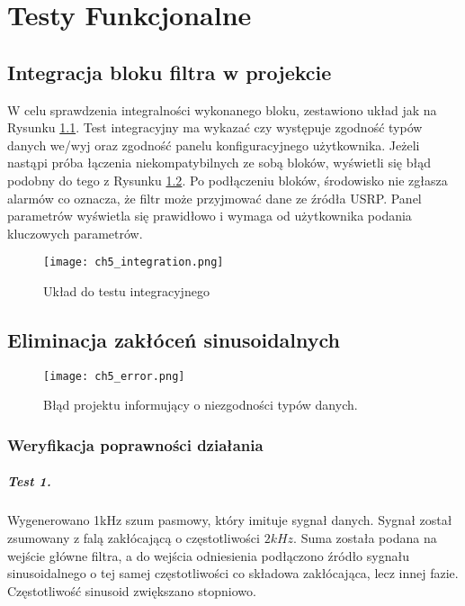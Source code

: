 \chapter{Testy Funkcjonalne}
\section{Integracja bloku filtra w projekcie}

W celu sprawdzenia integralności wykonanego bloku, zestawiono układ jak na Rysunku \ref{fig:itest}.
Test integracyjny ma wykazać czy występuje zgodność typów danych we/wyj oraz zgodność panelu konfiguracyjnego użytkownika.
Jeżeli nastąpi próba łączenia niekompatybilnych ze sobą bloków, wyświetli się błąd podobny do tego z Rysunku \ref{fig:error}.
Po podłączeniu bloków, środowisko nie zgłasza alarmów co oznacza, że filtr może przyjmować dane ze źródła USRP. 
Panel parametrów wyświetla się prawidłowo i wymaga od użytkownika podania kluczowych parametrów.
  
\begin{figure}[ht]
\centering
\texttt{[image: ch5\_integration.png]}
\caption{Układ do testu integracyjnego}
\label{fig:itest}
\end{figure}

\section{Eliminacja zakłóceń sinusoidalnych}

\begin{figure}[ht]
\centering
\texttt{[image: ch5\_error.png]}
\caption{Błąd projektu informujący o niezgodności typów danych.}
\label{fig:error}
\end{figure}
\subsection{Weryfikacja poprawności działania}

\paragraph{Test 1.}
Wygenerowano 1kHz szum pasmowy, który imituje sygnał danych.
Sygnał został zsumowany z falą zakłócającą o częstotliwości $2kHz$.
Suma została podana na wejście główne filtra, a do wejścia odniesienia podłączono źródło sygnału sinusoidalnego o tej samej częstotliwości co składowa zakłócająca, lecz innej fazie.
Częstotliwość sinusoid zwiększano stopniowo.

